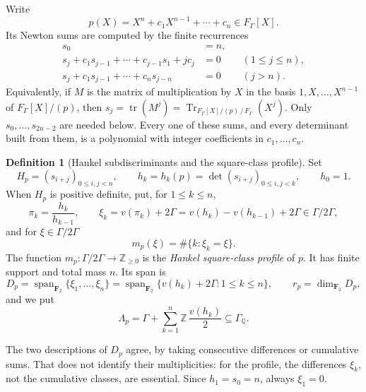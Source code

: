 \documentclass[11pt,a4paper]{article}
\numberwithin{equation}{section}
\theoremstyle{definition}
\newtheorem{definition}[definition]{Definition}
\theoremstyle{remark}
\newcommand{\Q}{\mathbb Q}
\newcommand{\Z}{\mathbb Z}
\newcommand{\tr}{\operatorname{tr}}
\newcommand{\Span}{\operatorname{span}}
\newcommand{\Tr}{\operatorname{Tr}}
\begin{document}
Write
\[
 p(X)=X^n+c_1X^{n-1}+\cdots+c_n\in F_\Gamma[X].
\]
Its Newton sums are computed by the finite recurrences
\begin{align}
 s_0&=n,\\
 s_j+c_1s_{j-1}+\cdots+c_{j-1}s_1+jc_j&=0
       &&(1\le j\le n),\label{spec:hank:eq:newton1}\\
 s_j+c_1s_{j-1}+\cdots+c_ns_{j-n}&=0
       &&(j>n).\label{spec:hank:eq:newton2}
\end{align}
Equivalently, if $M$ is the matrix of multiplication by $X$ in the basis
$1,X,\ldots,X^{n-1}$ of $F_\Gamma[X]/(p)$, then
$s_j=\tr(M^j)=\Tr_{F_\Gamma[X]/(p)\,/\,F_\Gamma}(X^j)$. Only
$s_0,\ldots,s_{2n-2}$ are needed below. Every one of these sums, and every
determinant built from them, is a polynomial with integer coefficients in
$c_1,\ldots,c_n$.

\begin{definition}[Hankel subdiscriminants and the square-class profile]
\label{spec:hank:def:profile}
Set
\[
 H_p=(s_{i+j})_{0\le i,j<n},\qquad
 h_k=h_k(p)=\det(s_{i+j})_{0\le i,j<k},\qquad h_0=1.
\]
When $H_p$ is positive definite, put, for $1\le k\le n$,
\[
 \pi_k=\frac{h_k}{h_{k-1}},\qquad
 \xi_k=v(\pi_k)+2\Gamma=v(h_k)-v(h_{k-1})+2\Gamma\in\Gamma/2\Gamma,
\]
and for $\xi\in\Gamma/2\Gamma$
\[
 m_p(\xi)=\#\{k:\xi_k=\xi\}.
\]
The function $m_p:\Gamma/2\Gamma\to\Z_{\ge0}$ is the \emph{Hankel
square-class profile} of $p$. It has finite support and total mass $n$. Its
span is
\[
 D_p=\Span_{\mathbf F_2}\{\xi_1,\ldots,\xi_n\}
    =\Span_{\mathbf F_2}\{v(h_k)+2\Gamma:1\le k\le n\},
 \qquad r_p=\dim_{\mathbf F_2}D_p,
\]
and we put
\[
 \Lambda_p=\Gamma+\sum_{k=1}^n\Z\,\frac{v(h_k)}2\subseteq\Gamma_\Q.
\]
\end{definition}

The two descriptions of $D_p$ agree, by taking consecutive differences or
cumulative sums. That does not identify their multiplicities: for the
profile, the differences $\xi_k$, not the cumulative classes, are essential.
Since $h_1=s_0=n$, always $\xi_1=0$.
\end{document}
